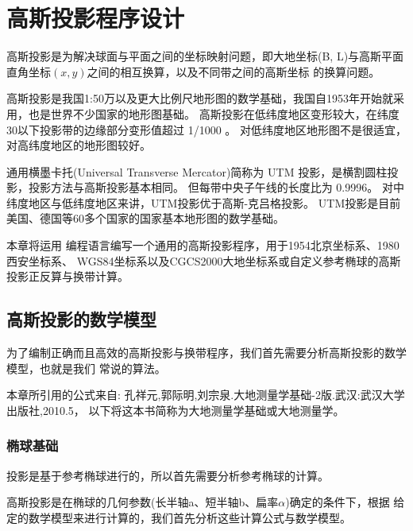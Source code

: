 
\chapter{高斯投影程序设计}

高斯投影是为解决球面与平面之间的坐标映射问题，即大地坐标(B,
L)与高斯平面直角坐标$(x,y)$之间的相互换算，以及不同带之间的高斯坐标
的换算问题。

高斯投影是我国1:50万以及更大比例尺地形图的数学基础，我国自1953年开始就采用，也是世界不少国家的地形图基础。
高斯投影在低纬度地区变形较大，在纬度30以下投影带的边缘部分变形值超过 1/1000 。
对低纬度地区地形图不是很适宜，对高纬度地区的地形图较好。

通用横墨卡托(Universal Transverse Mercator)简称为 UTM 投影，是横割圆柱投影，投影方法与高斯投影基本相同。
但每带中央子午线的长度比为 0.9996。
对中纬度地区与低纬度地区来讲，UTM投影优于高斯-克吕格投影。
UTM投影是目前美国、德国等60多个国家的国家基本地形图的数学基础。

本章将运用 \cs 编程语言编写一个通用的高斯投影程序，用于1954北京坐标系、1980西安坐标系、
WGS84坐标系以及CGCS2000大地坐标系或自定义参考椭球的高斯投影正反算与换带计算。


\section{高斯投影的数学模型}

为了编制正确而且高效的高斯投影与换带程序，我们首先需要分析高斯投影的数学模型，也就是我们
常说的算法。

本章所引用的公式来自:
孔祥元,郭际明,刘宗泉.大地测量学基础-2版.武汉:武汉大学出版社,2010.5，
以下将这本书简称为大地测量学基础或大地测量学。

\subsection{椭球基础}
投影是基于参考椭球进行的，所以首先需要分析参考椭球的计算。

高斯投影是在椭球的几何参数(长半轴a、短半轴b、扁率$\alpha$)确定的条件下，根据
给定的数学模型来进行计算的，我们首先分析这些计算公式与数学模型。

